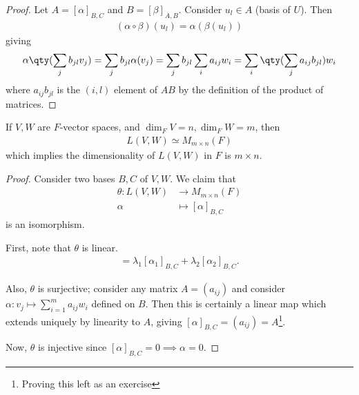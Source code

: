 \begin{proof}
    Let $A = [\alpha]_{B, C}$ and $B = [\beta]_{A, B}$.
    Consider $u_l \in A$ (basis of $U$).
    Then
    \begin{align*}
        (\alpha \circ \beta)(u_l) = \alpha(\beta(u_l))
    \end{align*}
    giving
    \begin{align*}
        \alpha\qty(\sum_j b_{jl} v_j) = \sum_j b_{jl} \alpha(v_j) = \sum_j b_{jl} \sum_i a_{ij} w_i = \sum_i \qty( \sum_j a_{ij} b_{jl} ) w_i
    \end{align*}
    where $a_{ij} b_{jl}$ is the $(i, l)$ element of $AB$ by the definition of the product of matrices.
\end{proof}
\begin{proposition} \label{prp:dimmapspace}
    If $V, W$ are $F$-vector spaces, and $\dim_F V = n, \dim_F W = m$, then
    \begin{align*}
        L(V,W) \simeq M_{m \times n}(F)
    \end{align*}
    which implies the dimensionality of $L(V,W)$ in $F$ is $m \times n$.
\end{proposition}
\begin{proof}
    Consider two bases $B, C$ of $V, W$.
    We claim that
    \begin{align*}
        \theta \colon L(V,W) &\to M_{m \times n}(F) \\
        \alpha &\mapsto [\alpha]_{B, C}
    \end{align*}
    is an isomorphism.

    First, note that $\theta$ is linear.
    \begin{align*}
        [\lambda_1 \alpha_1 + \lambda_2 \alpha_2] = \lambda_1 [\alpha_1]_{B, C} + \lambda_2 [\alpha_2]_{B, C}.
    \end{align*} 

    Also, $\theta$ is surjective; consider any matrix $A = (a_{ij})$ and consider $\alpha \colon v_j \mapsto \sum_{i=1}^m a_{ij} w_i$ defined on $B$.
    Then this is certainly a linear map which extends uniquely by linearity to $A$, giving $[\alpha]_{B,C} = (a_{ij}) = A$\footnote{Proving this left as an exercise}.

    Now, $\theta$ is injective since $[\alpha]_{B,C} = 0 \implies \alpha = 0$.
\end{proof}
